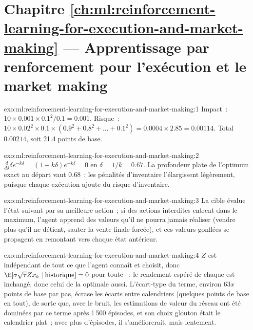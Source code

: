 \section*{Chapitre \ref{ch:ml:reinforcement-learning-for-execution-and-market-making} --- Apprentissage par renforcement pour l'exécution et le market making}

\begin{solution}{exo:ml:reinforcement-learning-for-execution-and-market-making:1}
Impact~: $10\times0.001\times0.1^2/0.1 = 0.001$. Risque~: $10\times0.02^2\times0.1\times(0.9^2 + 0.8^2 + \dots + 0.1^2) =
0.0004\times2.85 = 0.00114$. Total $0.00214$, soit 21.4 points de base.
\end{solution}

\begin{solution}{exo:ml:reinforcement-learning-for-execution-and-market-making:2}
$\frac{d}{d\delta}\delta e^{-k\delta} = (1 - k\delta)e^{-k\delta} = 0$ en $\delta = 1/k = 0.67$. La profondeur plate de l'optimum exact
au départ vaut 0.68~: les pénalités d'inventaire l'élargissent légèrement, puisque chaque exécution ajoute du risque d'inventaire.
\end{solution}

\begin{solution}{exo:ml:reinforcement-learning-for-execution-and-market-making:3}
La cible évalue l'état suivant par sa meilleure action~; si des actions interdites entrent dans le maximum, l'agent apprend des valeurs
qu'il ne pourra jamais réaliser (vendre plus qu'il ne détient, sauter la vente finale forcée), et ces valeurs gonflées se propagent
en remontant vers chaque état antérieur.
\end{solution}

\begin{solution}{exo:ml:reinforcement-learning-for-execution-and-market-making:4}
$Z$ est indépendant de tout ce que l'agent connaît et choisit, donc $\E[\sigma\sqrt\tau Zx_k\mid\text{historique}] = 0$ pour toute
~: le rendement espéré de chaque  est inchangé, donc celui de la  optimale aussi. L'écart-type du terme, environ
$63x$ points de base par pas, écrase les écarts entre calendriers (quelques points de base en tout), de sorte que, avec le bruit, les
estimations de valeur du réseau ont été dominées par ce terme après 1\,500 épisodes, et son choix glouton était le calendrier plat~; avec plus
d'épisodes, il s'améliorerait, mais lentement.
\end{solution}

